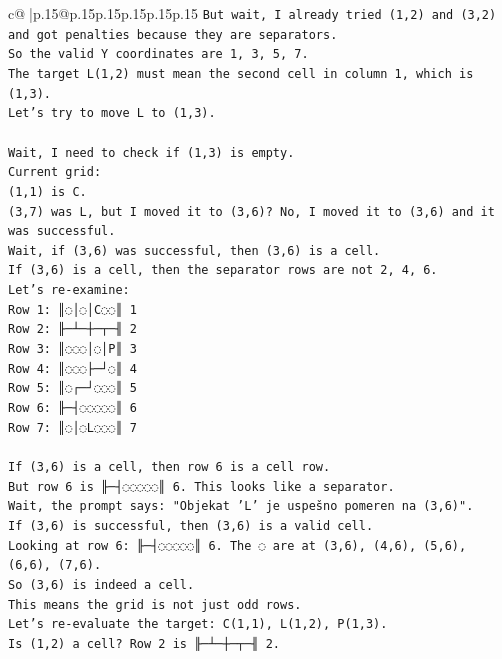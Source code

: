 \documentclass{article}
\begin{document}
{\begin{supertabular}{c@{$\;$}|p{.15\linewidth}@{}p{.15\linewidth}p{.15\linewidth}p{.15\linewidth}p{.15\linewidth}p{.15\linewidth}}
{{{\texttt{But wait, I already tried (1,2) and (3,2) and got penalties because they are separators.} \\
\texttt{So the valid Y coordinates are 1, 3, 5, 7.} \\
\texttt{The target L(1,2) must mean the second cell in column 1, which is (1,3).} \\
\texttt{Let's try to move L to (1,3).} \\
\\ 
\texttt{Wait, I need to check if (1,3) is empty.} \\
\texttt{Current grid:} \\
\texttt{(1,1) is C.} \\
\texttt{(3,7) was L, but I moved it to (3,6)? No, I moved it to (3,6) and it was successful.} \\
\texttt{Wait, if (3,6) was successful, then (3,6) is a cell.} \\
\texttt{If (3,6) is a cell, then the separator rows are not 2, 4, 6.} \\
\texttt{Let's re{-}examine:} \\
\texttt{Row 1: ║◌│◌│C◌◌║ 1} \\
\texttt{Row 2: ╟─┴─┼─┬─╢ 2} \\
\texttt{Row 3: ║◌◌◌│◌│P║ 3} \\
\texttt{Row 4: ║◌◌◌├─┘◌║ 4} \\
\texttt{Row 5: ║◌┌─┘◌◌◌║ 5} \\
\texttt{Row 6: ╟─┤◌◌◌◌◌║ 6} \\
\texttt{Row 7: ║◌│◌L◌◌◌║ 7} \\
\\ 
\texttt{If (3,6) is a cell, then row 6 is a cell row.} \\
\texttt{But row 6 is ╟─┤◌◌◌◌◌║ 6. This looks like a separator.} \\
\texttt{Wait, the prompt says: "Objekat 'L' je uspešno pomeren na (3,6)".} \\
\texttt{If (3,6) is successful, then (3,6) is a valid cell.} \\
\texttt{Looking at row 6: ╟─┤◌◌◌◌◌║ 6. The ◌ are at (3,6), (4,6), (5,6), (6,6), (7,6).} \\
\texttt{So (3,6) is indeed a cell.} \\
\texttt{This means the grid is not just odd rows.} \\
\texttt{Let's re{-}evaluate the target: C(1,1), L(1,2), P(1,3).} \\
\texttt{Is (1,2) a cell? Row 2 is ╟─┴─┼─┬─╢ 2.} \\
}}}
\end{supertabular}}
\end{document}
